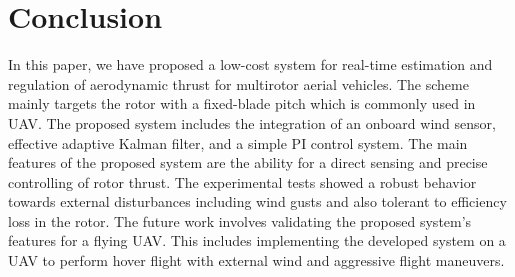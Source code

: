 \documentclass[conference]{IEEEtran}
\begin{document}
\section{Conclusion}

In this paper, we have proposed a low-cost system for real-time estimation and regulation of aerodynamic thrust for multirotor aerial vehicles. The scheme mainly targets the rotor with a fixed-blade pitch which is commonly used in UAV. The proposed system includes the integration of an onboard wind sensor, effective adaptive Kalman filter, and a simple PI control system. The main features of the proposed system are the ability for a direct sensing and precise controlling of rotor thrust. The experimental tests showed a robust behavior towards external disturbances including wind gusts and also tolerant to efficiency loss in the rotor. 
The future work involves validating the proposed system’s features for a flying UAV. This includes implementing the developed system on a UAV to perform hover flight with external wind and aggressive flight maneuvers. 
\end{document}

